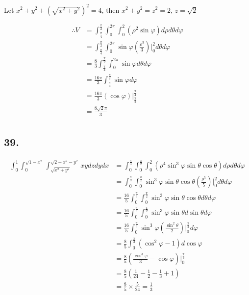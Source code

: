 \documentclass{article}
\begin{document}
  Let $x^2 + y^2 + (\sqrt{x^2 + y^2})^2 = 4$, then $x^2 + y^2 = z^2 = 2$, $z = \sqrt 2$

  $$\begin{aligned}
    \therefore V &= \int_{\frac \pi 4}^{\frac \pi 2} \int_0^{2\pi} \int_0^2 (\rho^2 \sin \varphi) d\rho d\theta d\varphi \\
    &= \int_{\frac \pi 4}^{\frac \pi 2} \int_0^{2\pi} \sin \varphi (\frac{\rho^3}{3})\biggl|_0^2 d\theta d\varphi \\
    &= \frac 8 3 \int_{\frac \pi 4}^{\frac \pi 2} \int_0^{2\pi} \sin \varphi d\theta d\varphi \\
    &= \frac{16\pi}{3} \int_{\frac \pi 4}^{\frac \pi 2} \sin \varphi d\varphi \\
    &= \frac{16\pi}{3} (\cos \varphi)\biggl|_{\frac \pi 2}^{\frac \pi 4} \\
    &= \frac{8\sqrt 2\pi}{3} \\
  \end{aligned}$$
  
  \subsection*{39. }

  $$\begin{aligned}
    \int_0^1 \int_0^{\sqrt{1-x^2}}\int_{\sqrt{x^2 + y^2}}^{\sqrt{2-x^2 - y^2}} xy dz dy dx &= \int_0^{\frac \pi 3} \int_0^{\frac \pi 2} \int_0^2 (\rho^4 \sin^3 \varphi \sin \theta \cos \theta) d\rho d\theta d\varphi \\
    &= \int_0^{\frac \pi 3} \int_0^{\frac \pi 2} \sin^3 \varphi \sin \theta \cos \theta (\frac{\rho^5}{5})\biggl|_0^2 d\theta d\varphi \\
    &= \frac{16}{5} \int_0^{\frac \pi 3} \int_0^{\frac \pi 2} \sin^3 \varphi \sin \theta \cos \theta d\theta d\varphi \\
    &= \frac{16}{5} \int_0^{\frac \pi 3} \int_0^{\frac \pi 2} \sin^3 \varphi \sin \theta d\sin \theta d\varphi \\
    &= \frac{16}{5} \int_0^{\frac \pi 3} \sin^3 \varphi (\frac{\sin^2 \theta}{2})\biggl|_0^{\frac \pi 2} d\varphi \\
    &= \frac{8}{5} \int_0^{\frac \pi 3} (\cos^2 \varphi - 1) d\cos \varphi \\
    &= \frac{8}{5} (\frac{\cos^3 \varphi}{3} - \cos \varphi)\biggl|_0^{\frac \pi 3} \\
    &= \frac 8 5 (\frac{1}{24} - \frac 1 2 - \frac 1 3 + 1) \\
    &= \frac 8 5 \times \frac{5}{24} = \frac 1 3 \\
  \end{aligned}$$
\end{document}
